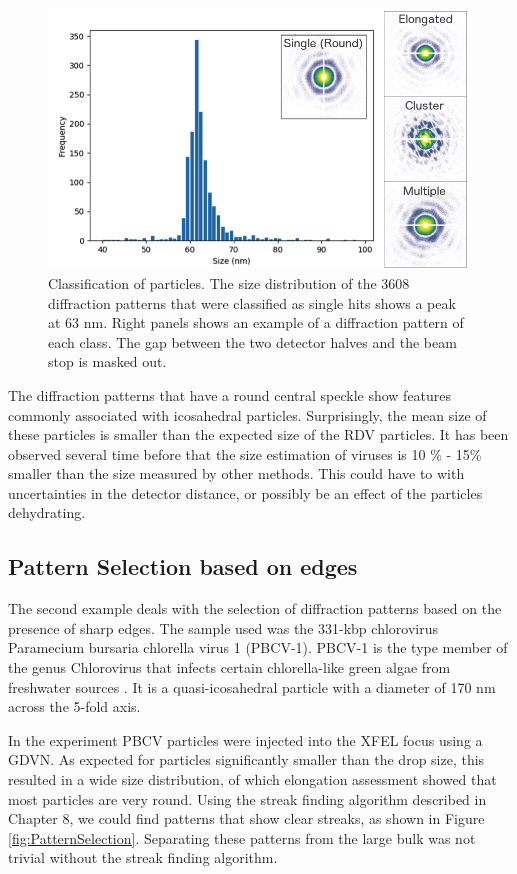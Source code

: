 \begin{figure}[!h]
\centering
\includegraphics[width=120mm]{Chapter_09_Results_RDV.png}
\caption{Classification of particles. The size distribution of the 3608 diffraction patterns that were classified as single hits shows a peak at 63 nm. Right panels shows an  example of a diffraction pattern of each class. The gap between the two detector halves and the beam stop is masked out.}\label{fig:Classes}

\end{figure}

The diffraction patterns that have a round central speckle show features commonly associated with icosahedral particles. Surprisingly, the mean size of these particles is smaller than the expected size of the RDV particles. It has been observed several time before that the size estimation of viruses is 10 \% - 15\% smaller than the size measured by other methods. This could have to with uncertainties in the detector distance, or possibly be an effect of the particles dehydrating. 


\subsection{Pattern Selection based on edges}
The second example deals with the selection of diffraction patterns based on the presence of sharp edges. The sample used was the 331-kbp chlorovirus Paramecium bursaria chlorella virus 1 (PBCV-1). PBCV-1 is the type member of the genus Chlorovirus that infects certain chlorella-like green algae from freshwater sources \cite{VanEtten2012}. It is a quasi-icosahedral particle with a diameter of 170 nm across the 5-fold axis.

In the experiment PBCV particles were injected into the XFEL focus using a GDVN. As expected for particles significantly smaller than the drop size, this resulted in a wide size distribution, of which elongation assessment showed that most particles are very round. Using the streak finding algorithm described in Chapter 8, we could find patterns that show clear streaks, as shown in Figure \ref{fig:PatternSelection}. Separating these patterns from the large bulk was not trivial without the streak finding algorithm.

